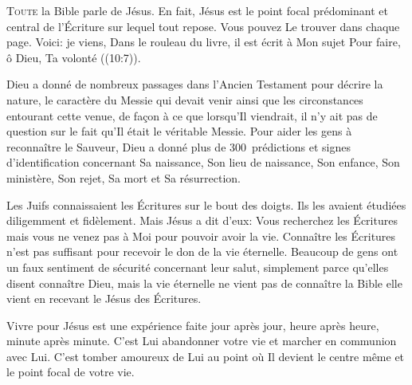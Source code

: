 


\lettrine{T}{oute} la Bible parle de Jésus.
 En fait, Jésus est le point focal prédominant et central de l'Écriture
 sur lequel tout repose. Vous pouvez Le trouver dans chaque page.
 \Og Voici: je viens, \ocadr Dans le rouleau du livre,
 il est écrit à Mon sujet \fcadr{}
 Pour faire, ô Dieu, Ta volonté \Fg{} ((10:7)).

Dieu a donné de nombreux passages dans l'Ancien Testament
 pour décrire la nature, le caractère du Messie qui devait venir
 ainsi que les circonstances entourant cette venue, de fa\c{c}on à ce que
 lorsqu'Il viendrait, il n'y ait pas de question sur le fait qu'Il était
 le véritable Messie. Pour aider les gens à reconnaître le Sauveur,
 Dieu a donné plus de 300~prédictions et signes d'identification
 concernant Sa naissance, Son lieu de naissance, Son enfance,
 Son ministère, Son rejet, Sa mort et Sa résurrection.


Les Juifs connaissaient les Écritures sur le bout des doigts.
 Ils les avaient étudiées diligemment et fidèlement.
 Mais Jésus a dit d'eux: 
 \Og Vous recherchez les Écritures mais vous ne venez pas à Moi
 pour pouvoir avoir la vie. \Fg{}
 Connaître les Écritures n'est pas suffisant pour recevoir
 le don de la vie éternelle. Beaucoup de gens ont un faux sentiment
 de sécurité concernant leur salut, simplement parce qu'elles disent
 connaître Dieu, mais la vie éternelle ne vient pas de connaître la Bible
 \ocadr elle vient en recevant le Jésus des Écritures.

Vivre pour Jésus est une expérience faite jour après jour,
 heure après heure, minute après minute.
 C'est Lui abandonner votre vie et marcher en communion avec Lui.
 C'est tomber amoureux de Lui au point où Il devient le centre même
 et le point focal de votre vie.

\dvrule



